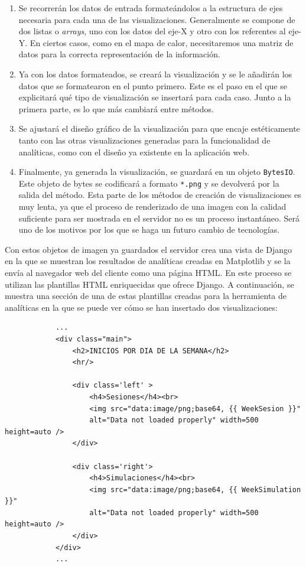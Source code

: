 \documentclass[a4paper, 12pt]{book}
\begin{document}
		\begin{enumerate}
			\item Se recorrerán los datos de entrada formateándolos a la estructura de ejes necesaria para cada una de las visualizaciones. Generalmente se compone de dos listas o \textit{arrays}, uno con los datos del eje-X y otro con los referentes al eje-Y. En ciertos casos, como en el mapa de calor, necesitaremos una matriz de datos para la correcta representación de la información. \\
			
			\item Ya con los datos formateados, se creará la visualización y se le añadirán los datos que se formatearon en el punto primero. Este es el paso en el que se explicitará qué tipo de visualización se insertará para cada caso. Junto a la primera parte, es lo que más cambiará entre métodos. \\
			
			\item Se ajustará el diseño gráfico de la visualización para que encaje estéticamente tanto con las otras visualizaciones generadas para la funcionalidad de analíticas, como con el diseño ya existente en la aplicación web.\\
			
			\item Finalmente, ya generada la visualización, se guardará en un objeto \texttt{BytesIO}. Este objeto de bytes se codificará a formato \texttt{*.png} y se devolverá por la salida del método. Esta parte de los métodos de creación de visualizaciones es muy lenta, ya que el proceso de renderizado de una imagen con la calidad suficiente para ser mostrada en el servidor no es un proceso instantáneo. Será uno de los motivos por los que se haga un futuro cambio de tecnologías.\\
		\end{enumerate}
		
		\clearpage
		Con estos objetos de imagen ya guardados el servidor crea una vista de Django en la que se muestran los resultados de analíticas creadas en Matplotlib y se la envía al navegador web del cliente como una página HTML. En este proceso se utilizan las plantillas HTML enriquecidas que ofrece Django. A continuación, se muestra una sección de una de estas plantillas creadas para la herramienta de analíticas en la que se puede ver cómo se han insertado dos visualizaciones:
		
		{\footnotesize
		\begin{verbatim}
			...
			<div class="main">
			    <h2>INICIOS POR DIA DE LA SEMANA</h2>
			    <hr/>
			
			    <div class='left' >
			        <h4>Sesiones</h4><br>
			        <img src="data:image/png;base64, {{ WeekSesion }}" 
			        alt="Data not loaded properly" width=500 height=auto />
			    </div>
			
			    <div class='right'>
			        <h4>Simulaciones</h4><br>
			        <img src="data:image/png;base64, {{ WeekSimulation }}" 
			        alt="Data not loaded properly" width=500 height=auto />
			    </div>
			</div>
			...
		\end{verbatim}
		}
			
\end{document}
